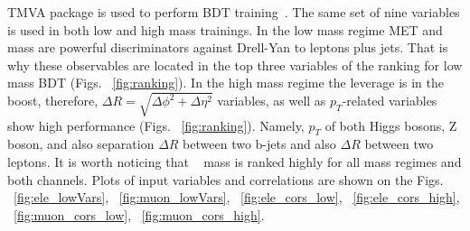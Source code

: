 TMVA package is used to perform BDT training~\cite{Hocker:2007ht}.
The same set of nine variables is used in both low and high mass
trainings.
In the low mass regime MET and \HBB~ mass are powerful discriminators against Drell-Yan to leptons plus jets. That is why these
observables are located in the top three variables of the ranking for low mass BDT (Figs. ~\ref{fig:ranking}). In the high mass regime the leverage is in the
boost, therefore, $\Delta R = \sqrt{\Delta \phi^2 + \Delta \eta^2}$ variables, as well as $p_{T}$-related variables show high
performance (Figs. ~\ref{fig:ranking}). Namely, $p_{T}$ of both Higgs bosons, Z boson, and also
separation $\Delta R $  between two b-jets and also $\Delta R $ between  two leptons.
It is worth noticing that \HBB~ mass is ranked highly for all mass regimes and both channels. Plots of input variables and correlations are shown on the Figs. ~\ref{fig:ele_lowVars}, ~\ref{fig:muon_lowVars}, ~\ref{fig:ele_cors_low}, ~\ref{fig:ele_cors_high}, ~\ref{fig:muon_cors_low}, ~\ref{fig:muon_cors_high}.

